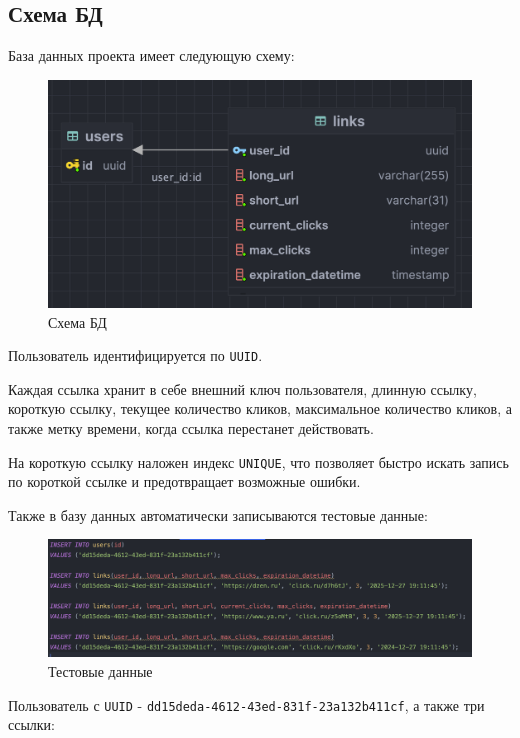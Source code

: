 \documentclass[a4paper, 14pt]{article}
\begin{document}
\subsection{Схема БД}

База данных проекта имеет следующую схему:

\begin{figure}[H]
	\centering
	\includegraphics[width=17cm]{resources/3.png}
	\caption{Схема БД}
\end{figure}

Пользователь идентифицируется по \texttt{UUID}.

Каждая ссылка хранит в себе внешний ключ пользователя, длинную ссылку, короткую ссылку, текущее количество кликов, максимальное количество кликов, а также метку времени, когда ссылка перестанет действовать.

На короткую ссылку наложен индекс \texttt{UNIQUE}, что позволяет быстро искать запись по короткой ссылке и предотвращает возможные ошибки.

Также в базу данных автоматически записываются тестовые данные:

\begin{figure}[H]
	\centering
	\includegraphics[width=17cm]{resources/4.png}
	\caption{Тестовые данные}
\end{figure}

Пользователь с \texttt {UUID} - \texttt{dd15deda-4612-43ed-831f-23a132b411cf}, а также три ссылки:
\end{document}
